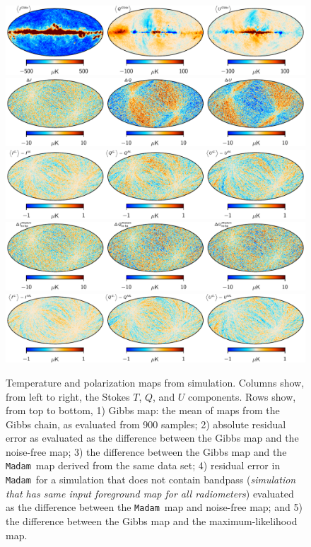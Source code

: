 \documentclass[twocolumn]{aa}
\newcommand{\Madam}{\texttt{Madam}}
\begin{document}
\begin{figure}[t]
  \center
  \includegraphics[width=0.93\linewidth]{figs/gibbs_map_30GHz_SampleMapT_SampleNoiseT_FillGapsT_FileMaskT_100to1000_NoMonopole.pdf}
  \includegraphics[width=0.93\linewidth]{figs/residual_noise_GibbsMap-Bin.pdf}\\
  \includegraphics[width=0.93\linewidth]{figs/residual_GibbsMap-Madam.pdf}\\
    \includegraphics[width=0.93\linewidth]{figs/residual_noise_Madam-Bin_NOBP.pdf}
  \includegraphics[width=0.93\linewidth]{figs/residual_GibbsMap-GibbsMapSampleF.pdf}    
  \caption{Temperature and polarization maps from simulation. Columns show, from left to right, the Stokes $T$, $Q$, and $U$ components. 
    Rows show, from top to bottom, 
    1) Gibbs map: the mean of maps from the Gibbs chain, as evaluated from 900 samples; 
    2) absolute residual error as evaluated as the difference between the Gibbs map and the noise-free map; 
    3) the difference between the Gibbs map and the \Madam\ map derived from the same data set; 
    4) residual error in \Madam\ for a simulation that does not contain bandpass 
    (\emph{simulation that has same input foreground map for all radiometers}) evaluated as the difference 
    between the \Madam\ map and noise-free map; and 
    5) the
    difference between the Gibbs map and the maximum-likelihood map.  }\label{fig:gibbs_map}
\end{figure}
\end{document}
